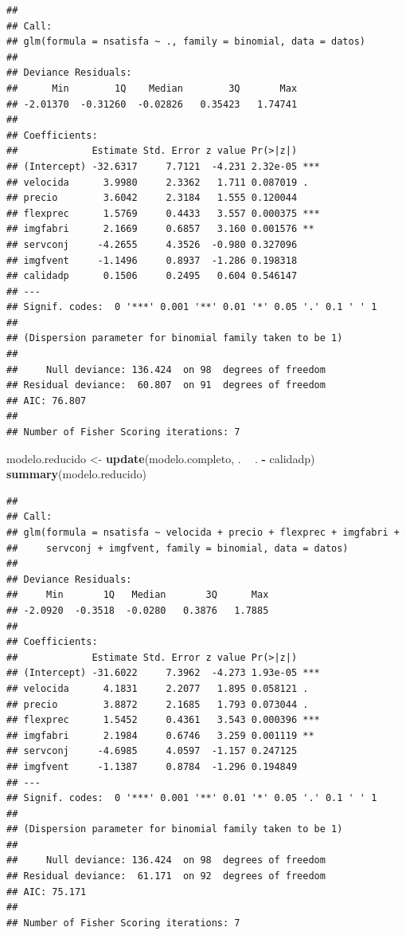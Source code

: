 \documentclass[]{book}
\newenvironment{Shaded}{\begin{snugshade}}{\end{snugshade}}
\newcommand{\KeywordTok}[1]{\textcolor[rgb]{0.13,0.29,0.53}{\textbf{#1}}}
\newcommand{\NormalTok}[1]{#1}
\newcommand{\OperatorTok}[1]{\textcolor[rgb]{0.81,0.36,0.00}{\textbf{#1}}}
\newcommand{\StringTok}[1]{\textcolor[rgb]{0.31,0.60,0.02}{#1}}
\begin{document}
\begin{verbatim}
## 
## Call:
## glm(formula = nsatisfa ~ ., family = binomial, data = datos)
## 
## Deviance Residuals: 
##      Min        1Q    Median        3Q       Max  
## -2.01370  -0.31260  -0.02826   0.35423   1.74741  
## 
## Coefficients:
##             Estimate Std. Error z value Pr(>|z|)    
## (Intercept) -32.6317     7.7121  -4.231 2.32e-05 ***
## velocida      3.9980     2.3362   1.711 0.087019 .  
## precio        3.6042     2.3184   1.555 0.120044    
## flexprec      1.5769     0.4433   3.557 0.000375 ***
## imgfabri      2.1669     0.6857   3.160 0.001576 ** 
## servconj     -4.2655     4.3526  -0.980 0.327096    
## imgfvent     -1.1496     0.8937  -1.286 0.198318    
## calidadp      0.1506     0.2495   0.604 0.546147    
## ---
## Signif. codes:  0 '***' 0.001 '**' 0.01 '*' 0.05 '.' 0.1 ' ' 1
## 
## (Dispersion parameter for binomial family taken to be 1)
## 
##     Null deviance: 136.424  on 98  degrees of freedom
## Residual deviance:  60.807  on 91  degrees of freedom
## AIC: 76.807
## 
## Number of Fisher Scoring iterations: 7
\end{verbatim}

\begin{Shaded}
\begin{Highlighting}[]
\NormalTok{modelo.reducido <-}\StringTok{ }\KeywordTok{update}\NormalTok{(modelo.completo, . }\OperatorTok{~}\StringTok{ }\NormalTok{. }\OperatorTok{-}\StringTok{ }\NormalTok{calidadp)}
\KeywordTok{summary}\NormalTok{(modelo.reducido)}
\end{Highlighting}
\end{Shaded}

\begin{verbatim}
## 
## Call:
## glm(formula = nsatisfa ~ velocida + precio + flexprec + imgfabri + 
##     servconj + imgfvent, family = binomial, data = datos)
## 
## Deviance Residuals: 
##     Min       1Q   Median       3Q      Max  
## -2.0920  -0.3518  -0.0280   0.3876   1.7885  
## 
## Coefficients:
##             Estimate Std. Error z value Pr(>|z|)    
## (Intercept) -31.6022     7.3962  -4.273 1.93e-05 ***
## velocida      4.1831     2.2077   1.895 0.058121 .  
## precio        3.8872     2.1685   1.793 0.073044 .  
## flexprec      1.5452     0.4361   3.543 0.000396 ***
## imgfabri      2.1984     0.6746   3.259 0.001119 ** 
## servconj     -4.6985     4.0597  -1.157 0.247125    
## imgfvent     -1.1387     0.8784  -1.296 0.194849    
## ---
## Signif. codes:  0 '***' 0.001 '**' 0.01 '*' 0.05 '.' 0.1 ' ' 1
## 
## (Dispersion parameter for binomial family taken to be 1)
## 
##     Null deviance: 136.424  on 98  degrees of freedom
## Residual deviance:  61.171  on 92  degrees of freedom
## AIC: 75.171
## 
## Number of Fisher Scoring iterations: 7
\end{verbatim}
\end{document}
